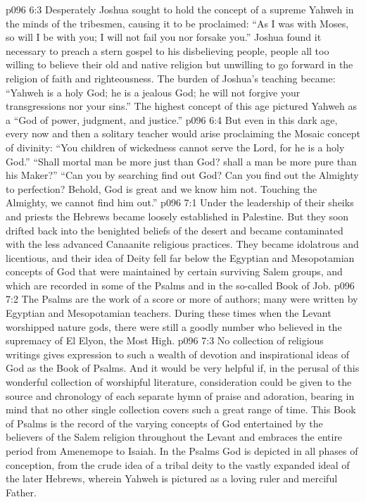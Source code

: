 \vs p096 6:3 Desperately Joshua sought to hold the concept of a supreme Yahweh in the minds of the tribesmen, causing it to be proclaimed: “As I was with Moses, so will I be with you; I will not fail you nor forsake you.” Joshua found it necessary to preach a stern gospel to his disbelieving people, people all too willing to believe their old and native religion but unwilling to go forward in the religion of faith and righteousness. The burden of Joshua’s teaching became: “Yahweh is a holy God; he is a jealous God; he will not forgive your transgressions nor your sins.” The highest concept of this age pictured Yahweh as a “God of power, judgment, and justice.”
\vs p096 6:4 But even in this dark age, every now and then a solitary teacher would arise proclaiming the Mosaic concept of divinity: “You children of wickedness cannot serve the Lord, for he is a holy God.” “Shall mortal man be more just than God? shall a man be more pure than his Maker?” “Can you by searching find out God? Can you find out the Almighty to perfection? Behold, God is great and we know him not. Touching the Almighty, we cannot find him out.”
\vs p096 7:1 Under the leadership of their sheiks and priests the Hebrews became loosely established in Palestine. But they soon drifted back into the benighted beliefs of the desert and became contaminated with the less advanced Canaanite religious practices. They became idolatrous and licentious, and their idea of Deity fell far below the Egyptian and Mesopotamian concepts of God that were maintained by certain surviving Salem groups, and which are recorded in some of the Psalms and in the so\hyp{}called Book of Job.
\vs p096 7:2 \pc The Psalms are the work of a score or more of authors; many were written by Egyptian and Mesopotamian teachers. During these times when the Levant worshipped nature gods, there were still a goodly number who believed in the supremacy of El Elyon, the Most High.
\vs p096 7:3 No collection of religious writings gives expression to such a wealth of devotion and inspirational ideas of God as the Book of Psalms. And it would be very helpful if, in the perusal of this wonderful collection of worshipful literature, consideration could be given to the source and chronology of each separate hymn of praise and adoration, bearing in mind that no other single collection covers such a great range of time. This Book of Psalms is the record of the varying concepts of God entertained by the believers of the Salem religion throughout the Levant and embraces the entire period from Amenemope to Isaiah. In the Psalms God is depicted in all phases of conception, from the crude idea of a tribal deity to the vastly expanded ideal of the later Hebrews, wherein Yahweh is pictured as a loving ruler and merciful Father.
